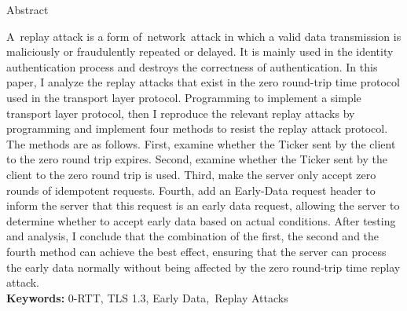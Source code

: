 \begin{center}
  Abstract
\end{center}

  A replay attack is a form of network attack in which a valid data transmission is maliciously or fraudulently repeated or delayed. It is mainly used in the identity authentication process and destroys the correctness of authentication. In this paper, I analyze the replay attacks that exist in the zero round-trip time protocol used in the transport layer protocol. Programming to implement a simple transport layer protocol, then I reproduce the relevant replay attacks by programming and implement four methods to resist the replay attack protocol. The methods are as follows. First, examine whether the Ticker sent by the client to the zero round trip expires. Second, examine whether the Ticker sent by the client to the zero round trip is used. Third, make the server only accept zero rounds of idempotent requests. Fourth, add an Early-Data request header to inform the server that this request is an early data request, allowing the server to determine whether to accept early data based on actual conditions. After testing and analysis, I conclude that the combination of the first, the second and the fourth method can achieve the best effect, ensuring that the server can process the early data normally without being affected by the zero round-trip time replay attack.
  \ \\
  \textbf{Keywords: }0-RTT, TLS 1.3, Early Data,\ Replay Attacks
\newpage